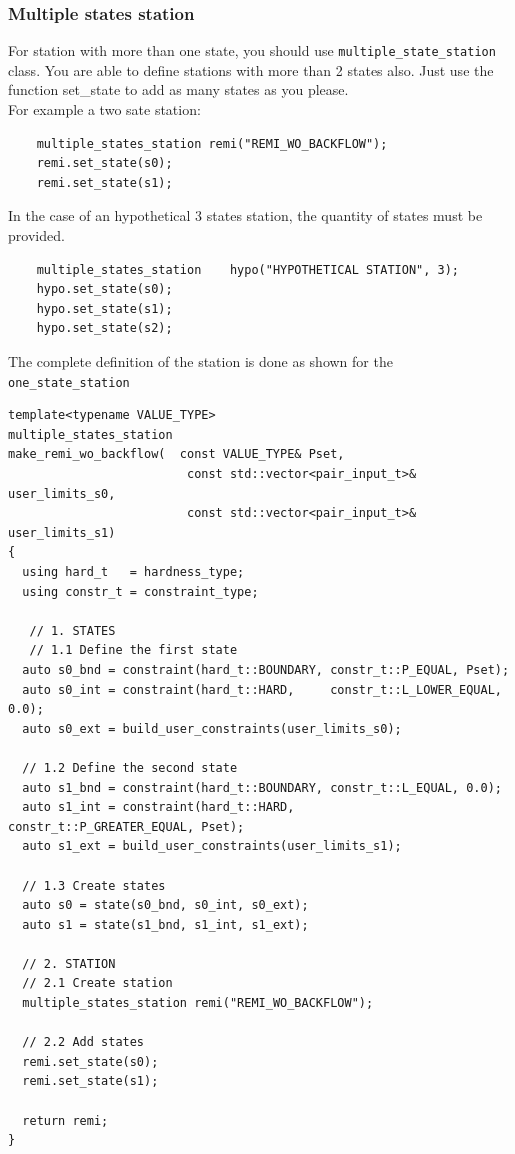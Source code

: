 \subsubsection{Multiple states station}  
        
For station with more than one state, you should use \texttt{multiple\_state\_station} class. 
You are able to define stations with more than 2 states also. Just use  the function {set\_state} to add as many states as you please. \\
    
For example a two sate station: 
\begin{verbatim}
    multiple_states_station remi("REMI_WO_BACKFLOW");
    remi.set_state(s0);
    remi.set_state(s1);
\end{verbatim}
In the case of an hypothetical 3 states station, the quantity of states must be provided.

\begin{verbatim}
    multiple_states_station    hypo("HYPOTHETICAL STATION", 3);
    hypo.set_state(s0);
    hypo.set_state(s1);        
    hypo.set_state(s2);              
\end{verbatim}    
The complete definition of the station is done as shown for the \texttt{one\_state\_station}            
                 
\begin{verbatim}
template<typename VALUE_TYPE>
multiple_states_station
make_remi_wo_backflow(  const VALUE_TYPE& Pset,
                         const std::vector<pair_input_t>& user_limits_s0,
                         const std::vector<pair_input_t>& user_limits_s1)
{
  using hard_t   = hardness_type;
  using constr_t = constraint_type;
  
   // 1. STATES
   // 1.1 Define the first state
  auto s0_bnd = constraint(hard_t::BOUNDARY, constr_t::P_EQUAL, Pset);
  auto s0_int = constraint(hard_t::HARD,     constr_t::L_LOWER_EQUAL, 0.0); 
  auto s0_ext = build_user_constraints(user_limits_s0);
 
  // 1.2 Define the second state
  auto s1_bnd = constraint(hard_t::BOUNDARY, constr_t::L_EQUAL, 0.0); 
  auto s1_int = constraint(hard_t::HARD,     constr_t::P_GREATER_EQUAL, Pset);
  auto s1_ext = build_user_constraints(user_limits_s1);

  // 1.3 Create states
  auto s0 = state(s0_bnd, s0_int, s0_ext);
  auto s1 = state(s1_bnd, s1_int, s1_ext);
 
  // 2. STATION
  // 2.1 Create station    
  multiple_states_station remi("REMI_WO_BACKFLOW");
  
  // 2.2 Add states
  remi.set_state(s0);
  remi.set_state(s1);

  return remi;
}
\end{verbatim}

